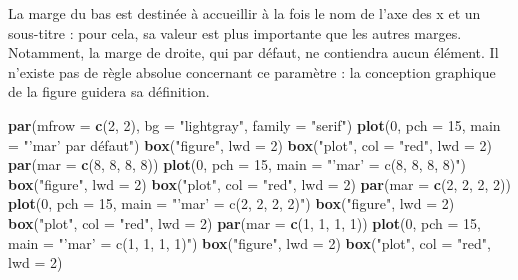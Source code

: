 \documentclass[]{article}
\newenvironment{Shaded}{\begin{snugshade}}{\end{snugshade}}
\newcommand{\DataTypeTok}[1]{\textcolor[rgb]{0.13,0.29,0.53}{#1}}
\newcommand{\DecValTok}[1]{\textcolor[rgb]{0.00,0.00,0.81}{#1}}
\newcommand{\KeywordTok}[1]{\textcolor[rgb]{0.13,0.29,0.53}{\textbf{#1}}}
\newcommand{\NormalTok}[1]{#1}
\newcommand{\StringTok}[1]{\textcolor[rgb]{0.31,0.60,0.02}{#1}}
\begin{document}
La marge du bas est destinée à accueillir à la fois le nom de l'axe des x et un sous-titre : pour cela, sa valeur est plus importante que les autres marges. Notamment, la marge de droite, qui par défaut, ne contiendra aucun élément.
Il n'existe pas de règle absolue concernant ce paramètre : la conception graphique de la figure guidera sa définition.

\begin{Shaded}
\begin{Highlighting}[]
\KeywordTok{par}\NormalTok{(}\DataTypeTok{mfrow =} \KeywordTok{c}\NormalTok{(}\DecValTok{2}\NormalTok{, }\DecValTok{2}\NormalTok{), }\DataTypeTok{bg =} \StringTok{"lightgray"}\NormalTok{, }\DataTypeTok{family =} \StringTok{"serif"}\NormalTok{)}
\KeywordTok{plot}\NormalTok{(}\DecValTok{0}\NormalTok{, }\DataTypeTok{pch =} \DecValTok{15}\NormalTok{, }\DataTypeTok{main =} \StringTok{"'mar' par défaut"}\NormalTok{)}
\KeywordTok{box}\NormalTok{(}\StringTok{"figure"}\NormalTok{, }\DataTypeTok{lwd =} \DecValTok{2}\NormalTok{)}
\KeywordTok{box}\NormalTok{(}\StringTok{"plot"}\NormalTok{, }\DataTypeTok{col =} \StringTok{"red"}\NormalTok{, }\DataTypeTok{lwd =} \DecValTok{2}\NormalTok{)}
\KeywordTok{par}\NormalTok{(}\DataTypeTok{mar =} \KeywordTok{c}\NormalTok{(}\DecValTok{8}\NormalTok{, }\DecValTok{8}\NormalTok{, }\DecValTok{8}\NormalTok{, }\DecValTok{8}\NormalTok{))}
\KeywordTok{plot}\NormalTok{(}\DecValTok{0}\NormalTok{, }\DataTypeTok{pch =} \DecValTok{15}\NormalTok{, }\DataTypeTok{main =} \StringTok{"'mar' = c(8, 8, 8, 8)"}\NormalTok{)}
\KeywordTok{box}\NormalTok{(}\StringTok{"figure"}\NormalTok{, }\DataTypeTok{lwd =} \DecValTok{2}\NormalTok{)}
\KeywordTok{box}\NormalTok{(}\StringTok{"plot"}\NormalTok{, }\DataTypeTok{col =} \StringTok{"red"}\NormalTok{, }\DataTypeTok{lwd =} \DecValTok{2}\NormalTok{)}
\KeywordTok{par}\NormalTok{(}\DataTypeTok{mar =} \KeywordTok{c}\NormalTok{(}\DecValTok{2}\NormalTok{, }\DecValTok{2}\NormalTok{, }\DecValTok{2}\NormalTok{, }\DecValTok{2}\NormalTok{))}
\KeywordTok{plot}\NormalTok{(}\DecValTok{0}\NormalTok{, }\DataTypeTok{pch =} \DecValTok{15}\NormalTok{, }\DataTypeTok{main =} \StringTok{"'mar' = c(2, 2, 2, 2)"}\NormalTok{)}
\KeywordTok{box}\NormalTok{(}\StringTok{"figure"}\NormalTok{, }\DataTypeTok{lwd =} \DecValTok{2}\NormalTok{)}
\KeywordTok{box}\NormalTok{(}\StringTok{"plot"}\NormalTok{, }\DataTypeTok{col =} \StringTok{"red"}\NormalTok{, }\DataTypeTok{lwd =} \DecValTok{2}\NormalTok{)}
\KeywordTok{par}\NormalTok{(}\DataTypeTok{mar =} \KeywordTok{c}\NormalTok{(}\DecValTok{1}\NormalTok{, }\DecValTok{1}\NormalTok{, }\DecValTok{1}\NormalTok{, }\DecValTok{1}\NormalTok{))}
\KeywordTok{plot}\NormalTok{(}\DecValTok{0}\NormalTok{, }\DataTypeTok{pch =} \DecValTok{15}\NormalTok{, }\DataTypeTok{main =} \StringTok{"'mar' = c(1, 1, 1, 1)"}\NormalTok{)}
\KeywordTok{box}\NormalTok{(}\StringTok{"figure"}\NormalTok{, }\DataTypeTok{lwd =} \DecValTok{2}\NormalTok{)}
\KeywordTok{box}\NormalTok{(}\StringTok{"plot"}\NormalTok{, }\DataTypeTok{col =} \StringTok{"red"}\NormalTok{, }\DataTypeTok{lwd =} \DecValTok{2}\NormalTok{)}
\end{Highlighting}
\end{Shaded}
\end{document}
